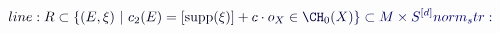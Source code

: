 \documentclass[12pt]{article}
\begin{document}
\makeatletter
\renewcommand*{\@textcolor}[3]{%
  \protect\leavevmode
  \begingroup
    \color#1{#2}#3%
  \endgroup
}
\makeatother
\begin{displaymath}
\mathcolor[RGB]{0,0,15}{line:
R\subset} \mathcolor[RGB]{0,0,30}{\{(E,\xi)~|~c_2(E)=[\mathrm{supp}(\xi)]+c\cdot} \mathcolor[RGB]{0,0,45}{o_X\in} \mathcolor[RGB]{0,0,60}{\CH_0(X)} \mathcolor[RGB]{0,0,75}{\}\subset} \mathcolor[RGB]{0,0,90}{M\times} \mathcolor[RGB]{0,0,105}{S^{[d]}

norm_str:}
\end{displaymath}
\end{document}
